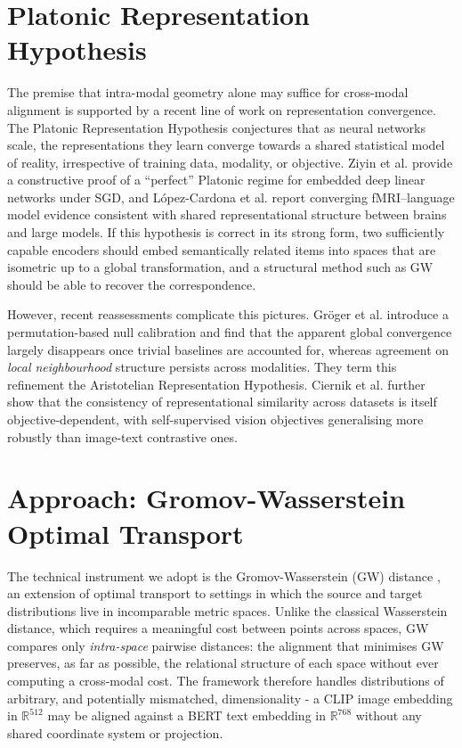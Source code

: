 \section{Platonic Representation Hypothesis}

The premise that intra-modal geometry alone may suffice for cross-modal alignment is supported by a recent line of work on representation convergence. The Platonic Representation Hypothesis \cite{huh2024platonic} conjectures that as neural networks scale, the representations they learn converge towards a shared statistical model of reality, irrespective of training data, modality, or objective. Ziyin et al. \cite{ziyin2025proof} provide a constructive proof of a ``perfect'' Platonic regime for embedded deep linear networks under SGD, and López-Cardona et al. \cite{lopezcardona2025brain} report converging fMRI--language model evidence consistent with shared representational structure between brains and large models. If this hypothesis is correct in its strong form, two sufficiently capable encoders should embed semantically related items into spaces that are isometric up to a global transformation, and a structural method such as GW should be able to recover the correspondence.

However, recent reassessments complicate this pictures. Gröger et al. \cite{groger2026aristotelian} introduce a permutation-based null calibration and find that the apparent global convergence largely disappears once trivial baselines are accounted for, whereas agreement on \emph{local neighbourhood} structure persists across modalities. They term this refinement the Aristotelian Representation Hypothesis. Ciernik et al. \cite{ciernik2024objective} further show that the consistency of representational similarity across datasets is itself objective-dependent, with self-supervised vision objectives generalising more robustly than image-text contrastive ones.

\section{Approach: Gromov-Wasserstein Optimal Transport}

The technical instrument we adopt is the Gromov-Wasserstein (GW) distance \cite{memoli2011gromov,peyre2016gromov}, an extension of optimal transport to settings in which the source and target distributions live in incomparable metric spaces. Unlike the classical Wasserstein distance, which requires a meaningful cost between points across spaces, GW compares only \emph{intra-space} pairwise distances: the alignment that minimises GW preserves, as far as possible, the relational structure of each space without ever computing a cross-modal cost. The framework therefore handles distributions of arbitrary, and potentially mismatched, dimensionality - a CLIP image embedding in $\mathbb{R}^{512}$ may be aligned against a BERT text embedding in $\mathbb{R}^{768}$ without any shared coordinate system or projection.

